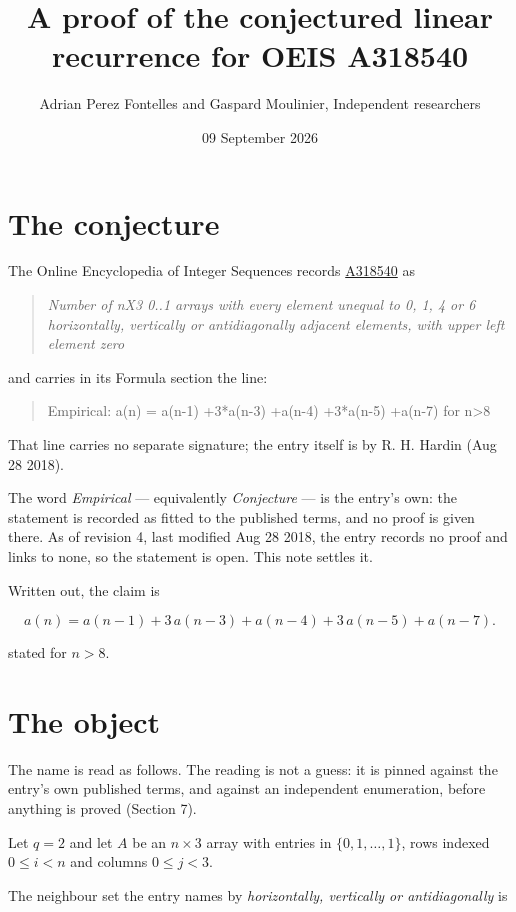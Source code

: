 \documentclass[11pt]{article}
\title{A proof of the conjectured linear recurrence for OEIS A318540}
\author{Adrian Perez Fontelles and Gaspard Moulinier, Independent researchers}
\date{09 September 2026}
\theoremstyle{definition}
\begin{document}
\maketitle
\section{The conjecture}

The Online Encyclopedia of Integer Sequences records \href{https://oeis.org/A318540}{A318540} as

\begin{quote}\itshape Number of nX3 0..1 arrays with every element unequal to 0, 1, 4 or 6 horizontally, vertically or antidiagonally adjacent elements, with upper left element zero\end{quote}

and carries in its Formula section the line:

\begin{quote}\ttfamily Empirical: a(n) = a(n-1) +3*a(n-3) +a(n-4) +3*a(n-5) +a(n-7) for n>8\end{quote}

That line carries no separate signature; the entry itself is by R. H. Hardin (Aug 28 2018).

The word {\itshape Empirical} --- equivalently {\itshape Conjecture} --- is the entry's own: the statement is recorded as fitted to the published terms, and no proof is given there. As of revision 4, last modified Aug 28 2018, the entry records no proof and links to none, so the statement is open. This note settles it.

Written out, the claim is

\[a(n) = a(n-1) + 3\,a(n-3) + a(n-4) + 3\,a(n-5) + a(n-7).\]

stated for $n > 8$.

\section{The object}

The name is read as follows. The reading is not a guess: it is pinned against the entry's own published terms, and against an independent enumeration, before anything is proved (Section 7).

Let $q = 2$ and let $A$ be an $n \times 3$ array with entries in $\{0,1,\dots,1\}$, rows indexed $0 \le i < n$ and columns $0 \le j < 3$.

The neighbour set the entry names by {\itshape horizontally, vertically or antidiagonally} is
\end{document}
